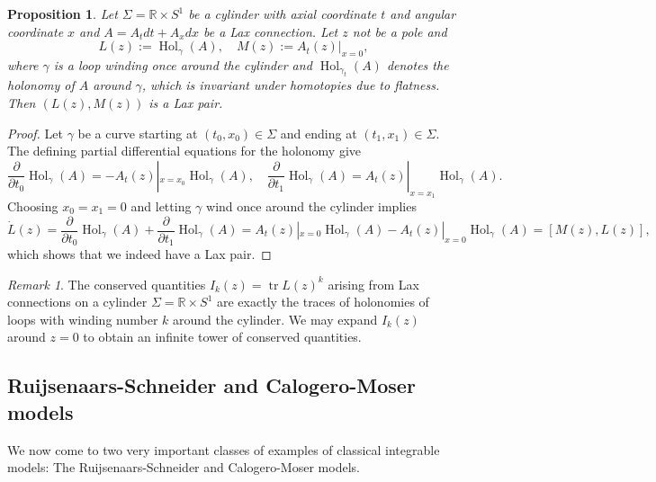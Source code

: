 \documentclass[11pt]{report}
\newtheorem{prop}[theorem]{Proposition}
\theoremstyle{definition}
\theoremstyle{remark}
\newtheorem*{remark}{Remark}
\theoremstyle{remark}
\newcommand{\R}{\mathbb{R}}
\begin{document}
\begin{prop}
Let $\Sigma = \R \times S^1$ be a cylinder with axial coordinate $t$ and angular coordinate $x$ and $A = A_t dt + A_x dx$ be a Lax connection. Let $z$ not be a pole and
\begin{equation*}
L(z) := \operatorname{Hol}_\gamma(A), \quad M(z) := A_t(z)|_{x=0},
\end{equation*}
where $\gamma$ is a loop winding once around the cylinder and $\operatorname{Hol}_{\gamma_t}(A)$ denotes the holonomy of $A$ around $\gamma$, which is invariant under homotopies due to flatness. Then $(L(z),M(z))$ is a Lax pair.
\end{prop}

\begin{proof}
Let $\gamma$ be a curve starting at $(t_0,x_0) \in \Sigma$ and ending at $(t_1,x_1) \in \Sigma$. The defining partial differential equations for the holonomy give
\begin{equation*}
\frac{\partial}{\partial t_0} \operatorname{Hol}_\gamma(A) = -A_t(z)|_{x=x_0} \operatorname{Hol}_\gamma(A), \quad \frac{\partial}{\partial t_1} \operatorname{Hol}_\gamma(A) = A_t(z)|_{x=x_1} \operatorname{Hol}_\gamma(A).
\end{equation*}
Choosing $x_0 = x_1 = 0$ and letting $\gamma$ wind once around the cylinder implies
\begin{equation*}
\dot L(z) = \frac{\partial}{\partial t_0} \operatorname{Hol}_\gamma(A) + \frac{\partial}{\partial t_1} \operatorname{Hol}_\gamma(A) = A_t(z)|_{x=0} \operatorname{Hol}_\gamma(A) - A_t(z)|_{x=0} \operatorname{Hol}_\gamma(A) = [M(z),L(z)],
\end{equation*}
which shows that we indeed have a Lax pair.
\end{proof}

\begin{remark}
The conserved quantities $I_k(z) = \operatorname{tr} L(z)^k$ arising from Lax connections on a cylinder $\Sigma = \R \times S^1$ are exactly the traces of holonomies of loops with winding number $k$ around the cylinder. We may expand $I_k(z)$ around $z=0$ to obtain an infinite tower of conserved quantities.
\end{remark}

\subsection{Ruijsenaars-Schneider and Calogero-Moser models}

We now come to two very important classes of examples of classical integrable models: The Ruijsenaars-Schneider and Calogero-Moser models.
\end{document}
